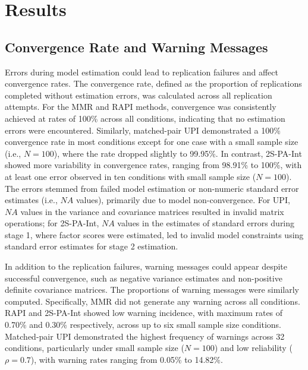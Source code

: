 \documentclass[
  man]{apa6}
\begin{document}
\section{Results}\label{results}

\subsection{Convergence Rate and Warning Messages}\label{convergence-rate-and-warning-messages}

Errors during model estimation could lead to replication failures and affect convergence rates. The convergence rate, defined as the proportion of replications completed without estimation errors, was calculated across all replication attempts. For the MMR and RAPI methods, convergence was consistently achieved at rates of 100\% across all conditions, indicating that no estimation errors were encountered. Similarly, matched-pair UPI demonstrated a 100\% convergence rate in most conditions except for one case with a small sample size (i.e., \(\textit{N} = 100\)), where the rate dropped slightly to 99.95\%. In contrast, 2S-PA-Int showed more variability in convergence rates, ranging from 98.91\% to 100\%, with at least one error observed in ten conditions with small sample size (\(\textit{N} = 100\)). The errors stemmed from failed model estimation or non-numeric standard error estimates (i.e., \(\textit{NA}\) values), primarily due to model non-convergence. For UPI, \(\textit{NA}\) values in the variance and covariance matrices resulted in invalid matrix operations; for 2S-PA-Int, \(\textit{NA}\) values in the estimates of standard errors during stage 1, where factor scores were estimated, led to invalid model constraints using standard error estimates for stage 2 estimation.

In addition to the replication failures, warning messages could appear despite successful convergence, such as negative variance estimates and non-positive definite covariance matrices. The proportions of warning messages were similarly computed. Specifically, MMR did not generate any warning across all conditions. RAPI and 2S-PA-Int showed low warning incidence, with maximum rates of 0.70\% and 0.30\% respectively, across up to six small sample size conditions. Matched-pair UPI demonstrated the highest frequency of warnings across 32 conditions, particularly under small sample size (\(\textit{N} = 100\)) and low reliability (\(\rho = 0.7\)), with warning rates ranging from 0.05\% to 14.82\%.
\end{document}
